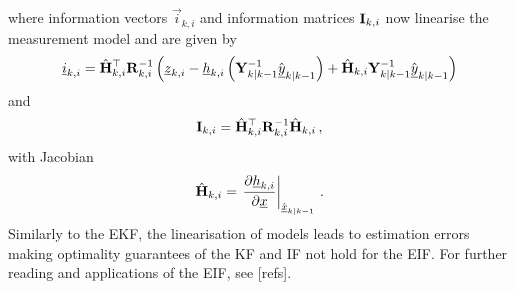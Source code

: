 where information vectors $\vec{i}_{k,i}$ and information matrices ${{\mathbf{I}}}_{k,i}$ now linearise the measurement model and are given by
\begin{equation}\label{eq:prelims:eif_measurement_vec_defn}
    {\underline{i}}_{k,i} = \hat{{{\mathbf{H}}}}_{k,i}^\top{\ensuremath{{\mathbf{R}}}}_{k,i}^{-1}\left({\underline{z}}_{k,i} - {\underline{h}}_{k,i}\left({{\mathbf{Y}}}_{k|k-1}^{-1}\hat{{\underline{y}}}_{k|k-1}\right) + \hat{{{\mathbf{H}}}}_{k,i}{{\mathbf{Y}}}_{k|k-1}^{-1}\hat{{\underline{y}}}_{k|k-1}\right)
\end{equation}
and
\begin{equation}\label{eq:prelims:eif_measurement_mat_defn}
    {\ensuremath{{\mathbf{I}}}}_{k,i} = \hat{{{\mathbf{H}}}}_{k,i}^\top{\ensuremath{{\mathbf{R}}}}_{k,i}^{-1}\hat{{{\mathbf{H}}}}_{k,i}\,,
\end{equation}
with Jacobian
\begin{equation}
    \hat{{{\mathbf{H}}}}_{k,i} = \left.\frac{\partial {\underline{h}}_{k,i}}{\partial {\underline{x}}}\right|_{\hat{{\underline{x}}}_{k|k-1}}\,.
\end{equation}
Similarly to the EKF, the linearisation of models leads to estimation errors making optimality guarantees of the KF and IF not hold for the EIF. For further reading and applications of the EIF, see [refs].

% 
% 

